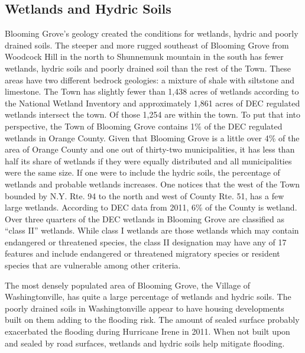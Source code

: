 \subsection{Wetlands and Hydric Soils}

Blooming Grove’s geology created the conditions for wetlands, hydric and poorly drained soils. The steeper and more rugged southeast of Blooming Grove from Woodcock Hill in the north to Shunnemunk mountain in the south has fewer wetlands, hydric soils and poorly drained soil than the rest of the Town. These areas have two different bedrock geologies: a mixture of shale with siltstone and limestone. The Town has slightly fewer than 1,438 acres of wetlands according to the National Wetland Inventory and approximately 1,861 acres of DEC regulated wetlands intersect the town. Of those 1,254 are within the town. To put that into perspective, the Town of Blooming Grove contains 1\% of the DEC regulated wetlands in Orange County. Given that Blooming Grove is a little over 4\% of the area of Orange County and one out of thirty-two municipalities, it has less than half its share of wetlands if they were equally distributed and all municipalities were the same size. If one were to include the hydric soils, the percentage of wetlands and probable wetlands increases. One notices that the west of the Town bounded by N.Y. Rte. 94 to the north and west of County Rte. 51, has a few large wetlands.
According to DEC data from 2011, 6\% of the County is wetland. Over three quarters of the DEC wetlands in Blooming Grove are classified as “class II” wetlands. While class I wetlands are those wetlands which may contain endangered or threatened species, the class II designation may have any of 17 features and include endangered or threatened migratory species or resident species that are vulnerable among other criteria.

The most densely populated area of Blooming Grove, the Village of Washingtonville, has quite a large percentage of wetlands and hydric soils. The poorly drained soils in Washingtonville appear to have housing developments built on them adding to the flooding risk. The amount of sealed surface probably exacerbated the flooding during Hurricane Irene in 2011. When not built upon and sealed by road surfaces, wetlands and hydric soils help mitigate flooding.

